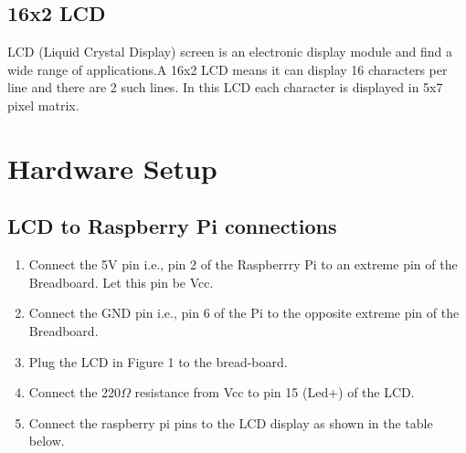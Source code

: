 \documentclass[11pt]{article}
\begin{document}
	\subsection{16x2 LCD}
		LCD (Liquid Crystal Display) screen is an electronic display module and find a wide range of applications.A 16x2 LCD means it can display 16 characters per line and there are 2 such lines. In this LCD each character is displayed in 5x7 pixel matrix.
		
\section{Hardware Setup}
		
	\subsection{LCD to Raspberry Pi connections}
		\begin{enumerate}
		\item Connect the 5V pin i.e., pin 2 of the Raspberrry Pi to an extreme pin of the Breadboard. Let this pin be Vcc.
		\item Connect the GND pin i.e., pin 6 of the Pi to the opposite extreme pin of the Breadboard.

		
		\item Plug the LCD in Figure 1 to the bread-board.
		\item  Connect the 220$\Omega$ resistance from Vcc to pin 15 (Led+) of the LCD.
		\item Connect the raspberry pi pins to the LCD display as shown in the table below.
		\end{enumerate}
\end{document}
